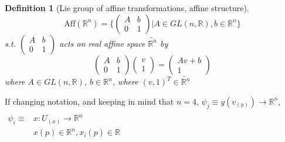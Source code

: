 \documentclass[10pt]{amsart}
\newtheorem{definition}{Definition}
\begin{document}
\begin{multicols*}{2}
\begin{definition}[Lie group of affine transformations, affine structure]
	\begin{equation}
	\text{Aff}(\mathbb{R}^n) = \lbrace \left(\begin{matrix} A & b \\ 0 & 1 \end{matrix} \right) | A \in GL(n, \mathbb{R}), b \in \mathbb{R}^n \rbrace
	\end{equation}
	s.t. $\left(\begin{matrix} A & b \\ 0 & 1 \end{matrix} \right)$ acts on real affine space $\widetilde{\mathbb{R}^n}$ by 
	\begin{equation}
	\left( \begin{matrix} A & b \\ 0 & 1 \end{matrix} \right) \left( \begin{matrix} v \\ 1 \end{matrix} \right) = \left( \begin{matrix} Av + b \\ 1 \end{matrix} \right) 
	\end{equation} where $A \in GL(n, \mathbb{R})$, $b\in \mathbb{R}^n$, where $(v,1)^T \in \widetilde{\mathbb{R}^n}$
\end{definition}

If changing notation, and keeping in mind that $n=4$, $\psi_j \equiv y(v_{(y)}) \to \mathbb{R}^n$, \\
$ \begin{aligned} & \quad \\ 
\psi_i \equiv & x : U_{(x)} \to \mathbb{R}^n \\ 
& x(p) \in \mathbb{R}^n, x_i(p) \in \mathbb{R} \end{aligned}$ \\


\end{multicols*}
\end{document}
